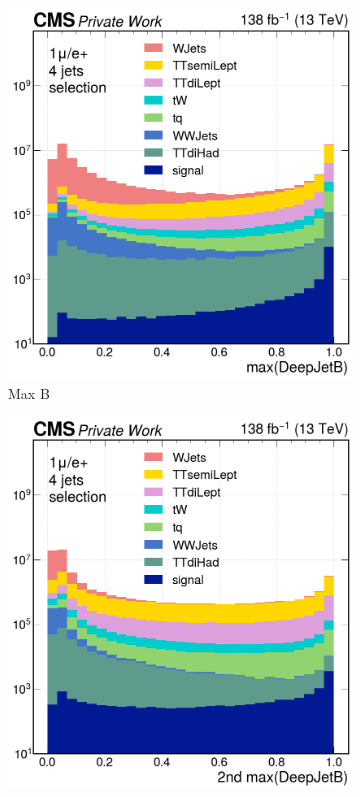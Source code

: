 \begin{figure}[H]
     \centering
     \begin{subfigure}{0.42\linewidth}
         \includegraphics[width=\linewidth]{fig//chap07-selection/btag/Max_DeepJetB.png}
         \caption{Max \DeepJet B}
     \end{subfigure}
    \begin{subfigure}{0.42\linewidth}
         \includegraphics[width=\linewidth]{fig//chap07-selection/btag/Second_Max_DeepJetB.png}

\end{subfigure}
\end{figure}
